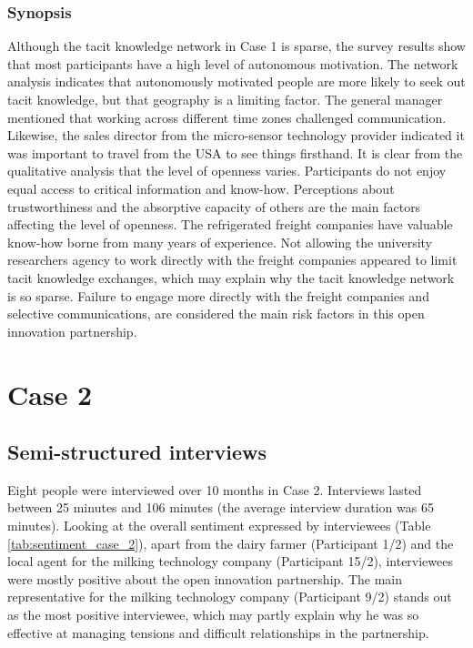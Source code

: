 \subsubsection{Synopsis}

Although the tacit knowledge network in Case 1 is sparse, the survey results show that most participants have a high level of autonomous motivation. The network analysis indicates that autonomously motivated people are more likely to seek out tacit knowledge, but that geography is a limiting factor. The general manager mentioned that working across different time zones challenged communication. Likewise, the sales director from the micro-sensor technology provider indicated it was important to travel from the USA to see things firsthand. It is clear from the qualitative analysis that the level of openness varies. Participants do not enjoy equal access to critical information and know-how. Perceptions about trustworthiness and the absorptive capacity of others are the main factors affecting the level of openness. The refrigerated freight companies have valuable know-how borne from many years of experience. Not allowing the university researchers agency to work directly with the freight companies appeared to limit tacit knowledge exchanges, which may explain why the tacit knowledge network is so sparse. Failure to engage more directly with the freight companies and selective communications, are considered the main risk factors in this open innovation partnership.

\section{Case 2}

\subsection{Semi-structured interviews}

Eight people were interviewed over 10 months in Case 2. Interviews lasted between 25 minutes and 106 minutes (the average interview duration was 65 minutes). Looking at the overall sentiment expressed by interviewees (Table \ref{tab:sentiment_case_2}), apart from the dairy farmer (Participant 1/2) and the local agent for the milking technology company (Participant 15/2), interviewees were mostly positive about the open innovation partnership. The main representative for the milking technology company (Participant 9/2) stands out as the most positive interviewee, which may partly explain why he was so effective at managing tensions and difficult relationships in the partnership.

